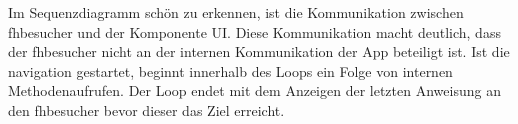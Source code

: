 \noindent Im Sequenzdiagramm schön zu erkennen, ist die Kommunikation zwischen \gls{fhbesucher} und der Komponente UI. Diese Kommunikation macht deutlich, dass der \gls{fhbesucher} nicht an der internen Kommunikation der App beteiligt ist. Ist die \gls{navigation} gestartet, beginnt innerhalb des Loops ein Folge von internen Methodenaufrufen. Der Loop endet mit dem Anzeigen der letzten Anweisung an den \gls{fhbesucher} bevor dieser das Ziel erreicht.